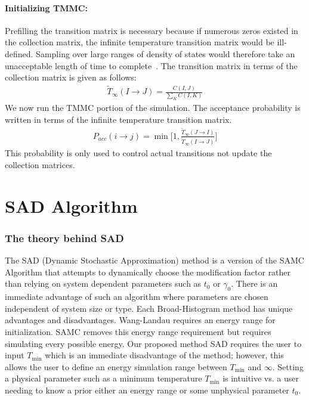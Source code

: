 \documentclass[letterpaper,twocolumn,amsmath,amssymb,pre,aps,10pt]{revtex4-1}
\begin{document}
\paragraph{Initializing TMMC:} Prefilling the transition
matrix is necessary because if numerous zeros existed in the collection
matrix, the infinite temperature transition matrix would be
ill-defined.  Sampling over large ranges of density of states would
therefore take an unacceptable length of time to
complete~\cite{shell2003improved, shen2014elucidating}.  The transition
matrix in terms of the collection matrix is given as
follows:
\begin{align}
\widetilde{T}_{\infty}(I\rightarrow J) = \frac{C(I,J)}
{\sum_{K} C(I,K)}
\end{align}
We now run the TMMC portion of the simulation.
The acceptance probability is written in terms of the infinite temperature
transition matrix.
\begin{align}
  P_{acc}(i\rightarrow j) = \min\bigg[1,\frac{\widetilde{T}_{\infty}(J\rightarrow I)}
  {\widetilde{T}_{\infty}(I\rightarrow J)}\bigg]
\end{align}
This probability is only used to control actual transitions not update
the collection matrices.

\section{SAD Algorithm}\label{sec:sad}
\subsubsection{The theory behind SAD}
The SAD (Dynamic Stochastic Approximation) method is a version of the SAMC
Algorithm that attempts to dynamically choose the modification factor
rather than relying on system dependent parameters such as $t_0$ or
$\gamma_0$.  There is an immediate advantage of such an algorithm where
parameters are chosen independent of system size or type. Each
Broad-Histogram method has unique advantages and disadvantages.
Wang-Landau requires an energy range for initialization.  SAMC removes
this energy range requirement but requires simulating every possible
energy. Our proposed method SAD requires the user to input
$T_\text{min}$ which is an immediate disadvantage of the method;
however, this allows the user to define an energy simulation
range between $T_\text{min}$ and $\infty$. Setting a physical parameter
such as a minimum temperature $T_\text{min}$ is intuitive vs. a user
needing to know a prior either an energy range or some unphysical
parameter $t_0$.
\end{document}
